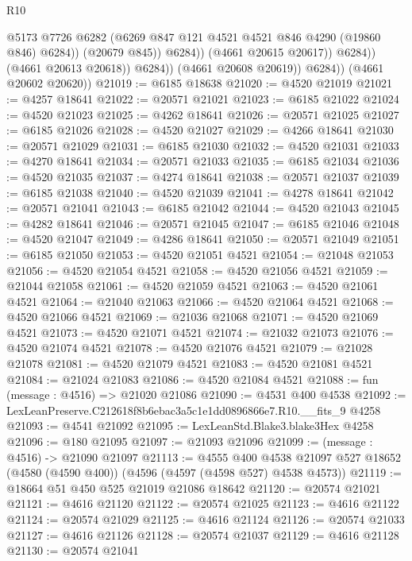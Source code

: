 \begin{lexlean}{R10}
\begin{coremodule}
                                @5173
                                @7726
                                @6282
                                (@6269 @847 @121 @4521 @4521 @846 @4290 (@19860 @846) @6284))
                              (@20679 @845))
                            @6284))
                        (@4661 @20615 @20617))
                      @6284))
                  (@4661 @20613 @20618))
                @6284))
            (@4661 @20608 @20619))
          @6284))
      (@4661 @20602 @20620))
@21019 := @6185 @18638
@21020 := @4520 @21019
@21021 := @4257 @18641
@21022 := @20571 @21021
@21023 := @6185 @21022
@21024 := @4520 @21023
@21025 := @4262 @18641
@21026 := @20571 @21025
@21027 := @6185 @21026
@21028 := @4520 @21027
@21029 := @4266 @18641
@21030 := @20571 @21029
@21031 := @6185 @21030
@21032 := @4520 @21031
@21033 := @4270 @18641
@21034 := @20571 @21033
@21035 := @6185 @21034
@21036 := @4520 @21035
@21037 := @4274 @18641
@21038 := @20571 @21037
@21039 := @6185 @21038
@21040 := @4520 @21039
@21041 := @4278 @18641
@21042 := @20571 @21041
@21043 := @6185 @21042
@21044 := @4520 @21043
@21045 := @4282 @18641
@21046 := @20571 @21045
@21047 := @6185 @21046
@21048 := @4520 @21047
@21049 := @4286 @18641
@21050 := @20571 @21049
@21051 := @6185 @21050
@21053 := @4520 @21051 @4521
@21054 := @21048 @21053
@21056 := @4520 @21054 @4521
@21058 := @4520 @21056 @4521
@21059 := @21044 @21058
@21061 := @4520 @21059 @4521
@21063 := @4520 @21061 @4521
@21064 := @21040 @21063
@21066 := @4520 @21064 @4521
@21068 := @4520 @21066 @4521
@21069 := @21036 @21068
@21071 := @4520 @21069 @4521
@21073 := @4520 @21071 @4521
@21074 := @21032 @21073
@21076 := @4520 @21074 @4521
@21078 := @4520 @21076 @4521
@21079 := @21028 @21078
@21081 := @4520 @21079 @4521
@21083 := @4520 @21081 @4521
@21084 := @21024 @21083
@21086 := @4520 @21084 @4521
@21088 := fun (message : @4516) => @21020 @21086
@21090 := @4531 @400 @4538
@21092 := LexLeanPreserve.C212618f8b6ebac3a5c1e1dd0896866e7.R10.__fits_9 @4258
@21093 := @4541 @21092
@21095 := LexLeanStd.Blake3.blake3Hex @4258
@21096 := @180 @21095
@21097 := @21093 @21096
@21099 := (message : @4516) -> @21090 @21097
@21113 := @4555
    @400
    @4538
    @21097
    @527
    @18652
    (@4580 (@4590 @400))
    (@4596 (@4597 (@4598 @527) @4538 @4573))
@21119 := @18664 @51 @450 @525 @21019 @21086 @18642
@21120 := @20574 @21021
@21121 := @4616 @21120
@21122 := @20574 @21025
@21123 := @4616 @21122
@21124 := @20574 @21029
@21125 := @4616 @21124
@21126 := @20574 @21033
@21127 := @4616 @21126
@21128 := @20574 @21037
@21129 := @4616 @21128
@21130 := @20574 @21041

\end{coremodule}
\end{lexlean}

